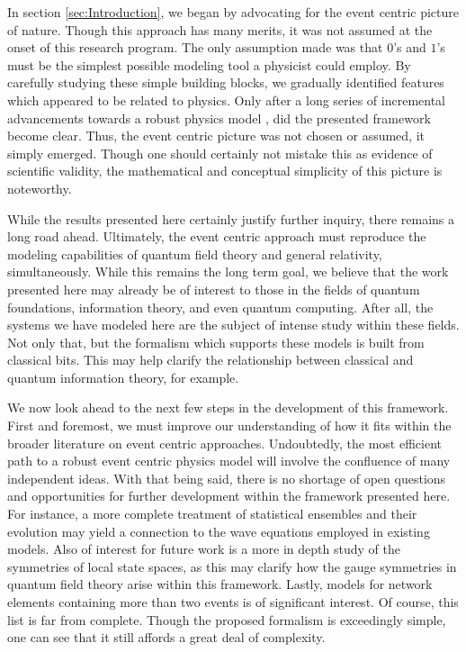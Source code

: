 \documentclass{article}
\begin{document}
In section \ref{sec:Introduction}, we began by advocating for the event centric picture of nature. Though this approach has many merits, it was not assumed at the onset of this research program. The only assumption made was that $0$'s and $1$'s must be the simplest possible modeling tool a physicist could employ. By carefully studying these simple building blocks, we gradually identified features which appeared to be related to physics. Only after a long series of incremental advancements towards a robust physics model \cite{Powers2022, Powers2023}, did the presented framework become clear. Thus, the event centric picture was not chosen or assumed, it simply emerged. Though one should certainly not mistake this as evidence of scientific validity, the mathematical and conceptual simplicity of this picture is noteworthy. 

While the results presented here certainly justify further inquiry, there remains a long road ahead. Ultimately, the event centric approach must reproduce the modeling capabilities of quantum field theory and general relativity, simultaneously. While this remains the long term goal, we believe that the work presented here may already be of interest to those in the fields of quantum foundations, information theory, and even quantum computing. After all, the systems we have modeled here are the subject of intense study within these fields. Not only that, but the formalism which supports these models is built from classical bits. This may help clarify the relationship between classical and quantum information theory, for example.  

We now look ahead to the next few steps in the development of this framework. First and foremost, we must improve our understanding of how it fits within the broader literature on event centric approaches. Undoubtedly, the most efficient path to a robust event centric physics model will involve the confluence of many independent ideas. With that being said, there is no shortage of open questions and opportunities for further development within the framework presented here. For instance, a more complete treatment of statistical ensembles and their evolution may yield a connection to the wave equations employed in existing models. Also of interest for future work is a more in depth study of the symmetries of local state spaces, as this may clarify how the gauge symmetries in quantum field theory arise within this framework. Lastly, models for network elements containing more than two events is of significant interest. Of course, this list is far from complete. Though the proposed formalism is exceedingly simple, one can see that it still affords a great deal of complexity.
 
\end{document}
